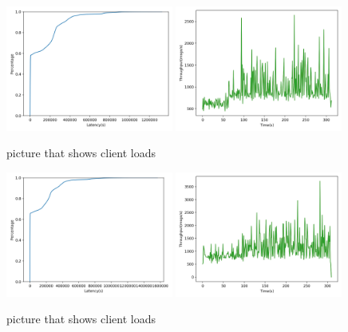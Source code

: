 \begin{figure}[!htb]
  \centering
  \includegraphics[width=0.49\textwidth,height=\textheight,keepaspectratio]{img/local10_lat.png}
  \includegraphics[width=0.49\textwidth,height=\textheight,keepaspectratio]{img/local10_tp.png}
  \caption{ picture that shows client loads }
  \label{fig:local10-performance}
\end{figure}

\begin{figure}[!htb]
  \centering
  \includegraphics[width=0.49\textwidth,height=\textheight,keepaspectratio]{img/local5_lat.png}
  \includegraphics[width=0.49\textwidth,height=\textheight,keepaspectratio]{img/local5_tp.png}
  \caption{ picture that shows client loads }
  \label{fig:local5-performance}
\end{figure}


